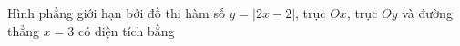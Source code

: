 \begin{ex}
Hình phẳng giới hạn bởi đồ thị hàm số $y=|2x-2|$, trục $Ox$, trục $Oy$ và đường thẳng $x=3$ có diện tích bằng
\end{ex}
